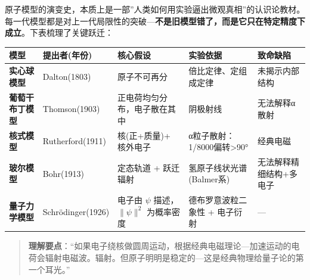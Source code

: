 原子模型的演变史，本质上是一部''人类如何用实验逼出微观真相''的认识论教材。每一代模型都是对上一代局限性的突破---\textbf{不是旧模型错了，而是它只在特定精度下成立}。下表梳理了关键跃迁：

{\def\LTcaptype{none} %
\begin{longtable}[]{@{}
  >{\raggedright\arraybackslash}p{}
  >{\raggedright\arraybackslash}p{}
  >{\raggedright\arraybackslash}p{}
  >{\raggedright\arraybackslash}p{}
  >{\raggedright\arraybackslash}p{}@{}}
\toprule\noalign{}
\begin{minipage}[b]{\linewidth}\raggedright
模型
\end{minipage} & \begin{minipage}[b]{\linewidth}\raggedright
提出者(年份)
\end{minipage} & \begin{minipage}[b]{\linewidth}\raggedright
核心假设
\end{minipage} & \begin{minipage}[b]{\linewidth}\raggedright
实验依据
\end{minipage} & \begin{minipage}[b]{\linewidth}\raggedright
致命缺陷
\end{minipage} \\
\midrule\noalign{}
\endhead
\bottomrule\noalign{}
\endlastfoot
\textbf{实心球模型} & Dalton(1803) & 原子不可再分 & 倍比定律、定组成定律 & 未揭示内部结构 \\
\textbf{葡萄干布丁模型} & Thomson(1903) & 正电荷均匀分布，电子散在其中 & 阴极射线 & 无法解释α散射 \\
\textbf{核式模型} & Rutherford(1911) & 核(正+质量)+ 核外电子 & α粒子散射：1/8000偏转\textgreater90° & 经典电磁 \\
\textbf{玻尔模型} & Bohr(1913) & 定态轨道 + 跃迁辐射 & 氢原子线状光谱(Balmer系) & 无法解释精细结构+多电子 \\
\textbf{量子力学模型} & Schrödinger(1926) & 电子由 \(\psi\) 描述，\(\|\psi\|^2\) 为概率密度 & 德布罗意波粒二象性 + 电子衍射 & --- \\
\end{longtable}
}

\begin{quote}
\textbf{理解要点}：``如果电子绕核做圆周运动，根据经典电磁理论---加速运动的电荷会辐射电磁波。辐射。但原子明明是稳定的---这是经典物理给量子论的第一个耳光。''
\end{quote}

